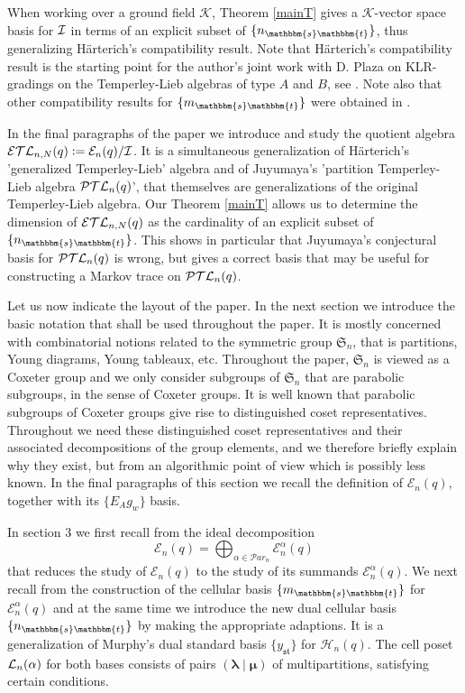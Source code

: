 \documentclass[10pt,a4,twoside,hidelinks,rm]{article}
\newcommand{\kk}{\mathcal{K}}
\newcommand{\Par}{{\mathcal Par}_n}
\newcommand\es{\mathbbm{s}}
\newcommand\et{\mathbbm{t}}
\newcommand{\s}{\mathfrak{s}}
\newcommand{\T}{\mathfrak{t}}
\newcommand{\Si}{\mathfrak{S}}
\newcommand{\PTL}{{\cal PTL}_n(q)}
\newcommand{\HH}{ \mathcal{H}_n(q)}
\newcommand{\E}{ {\mathcal E}_n(q)}
\newcommand{\Ea}{ {\mathcal E}_n^{\alpha}(q)}
\newcommand{\ETL}{ {\cal ETL}_{n,N}(q)}
\newcommand\blambda{{\boldsymbol\lambda}}
\newcommand\bmu{{\boldsymbol\mu}}
\theoremstyle{plain}
\begin{document}
\medskip
When working over a ground field $ \kk $, 
Theorem \ref{mainT} gives a $ \kk$-vector space basis for $ \cal I $ in terms of an explicit
subset of $ \{ n_{\es \et }\} $, thus generalizing H\"arterich's compatibility result. 
Note that
H\"arterich's 
compatibility result is the starting point for the author's joint work with D. Plaza on KLR-gradings
on the Temperley-Lieb algebras of type $A $ and $ B$, see \cite{PlaRy}.
Note also that other compatibility results for $ \{ m_{\es \et } \} $ were obtained
in \cite{ER}.

\medskip
In the final paragraphs of the paper we introduce and study the quotient algebra $ \ETL: =\E/\mathcal I $.
It is a simultaneous generalization of H\"arterich's 'generalized Temperley-Lieb' algebra
and of Juyumaya's 'partition Temperley-Lieb algebra $\PTL$', that themselves are generalizations of the original
Temperley-Lieb algebra. Our Theorem \ref{mainT} allows us to determine the dimension of $ \ETL$
as the cardinality of an explicit subset of $ \{ n_{\es \et} \} $. This shows in particular that Juyumaya's
conjectural basis for $ \PTL $ is wrong, but gives a correct basis that may be useful for constructing a
Markov trace on $\PTL$. 

\medskip
Let us now indicate the layout of the paper. In the next section we introduce the basic notation
that shall be used throughout the paper. It is mostly concerned with combinatorial notions
related to the symmetric group $ \Si_n $, that is partitions, Young diagrams, Young tableaux, etc. 
Throughout the paper, $ \Si_n $ is viewed as a Coxeter group and we only consider 
subgroups of $ \Si_n $ that 
are  
parabolic subgroups, in the sense of Coxeter groups. It is well known that parabolic subgroups
of Coxeter groups give rise to distinguished coset representatives. Throughout we need these
distinguished coset representatives
and their associated decompositions of the group elements, 
and we therefore briefly explain 
why they exist, but from an algorithmic point of view which is possibly less known.
In the final paragraphs of this section we recall the definition of $ \E$, together with its $ \{ E_A g_w \} $ basis.


In section 3 we first recall from \cite{ER} the ideal decomposition 
\begin{equation}\label{deideal} \E=\bigoplus_{\alpha\in\Par} \Ea \end{equation} that
reduces the study of $ \E $ to the study of its summands $ \Ea$. 
We next recall from \cite{ER} the construction of the cellular basis $ \{ m_{\es \et} \} $
for $ \Ea $ and at the same time we introduce the new dual cellular basis $ \{ n_{\es \et} \}$ 
by making the appropriate adaptions.
It is a generalization of Murphy's dual standard basis 
$ \{ y_{\s \T} \} $ for $ \HH$. 
The cell poset $ {\cal L}_n(\alpha) $ for both bases consists of pairs $ (\blambda \mid \bmu) $
of multipartitions, satisfying certain conditions.
\end{document}
